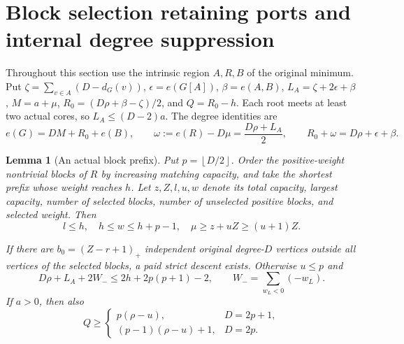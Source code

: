 \documentclass[11pt,a4paper]{article}
\newcommand{\floor}[1]{\left\lfloor#1\right\rfloor}
\newtheorem{lemma}[theorem]{Lemma}
\theoremstyle{definition}
\begin{document}
\section{Block selection retaining ports and internal degree suppression}\label{app:blocks}
Throughout this section use the intrinsic region $A,R,B$ of the original minimum.
Put $\zeta=\sum_{v\in A}(D-d_G(v))$, $\epsilon=e(G[A])$, $\beta=e(A,B)$,
$L_A=\zeta+2\epsilon+\beta$, $M=a+\mu$,
$R_0=(D\rho+\beta-\zeta)/2$, and $Q=R_0-h$.
Each root meets at least two actual cores, so $L_A\le(D-2)a$. The degree identities are
\begin{equation}\label{eq:block-account}
 e(G)=DM+R_0+e(B),\qquad
 \omega:=e(R)-D\mu=\frac{D\rho+L_A}{2},\qquad
 R_0+\omega=D\rho+\epsilon+\beta.
\end{equation}
\begin{lemma}[An actual block prefix]\label{lem:block-prefix}
Put $p=\floor{D/2}$. Order the positive-weight nontrivial blocks of $R$ by increasing matching capacity, and take the shortest prefix whose weight reaches $h$. Let $z,Z,l,u,w$ denote its total capacity, largest capacity, number of selected blocks, number of unselected positive blocks, and selected weight. Then
\[
 l\le h,\quad h\le w\le h+p-1,\quad
 \mu\ge z+uZ\ge(u+1)Z.
\]

If there are $b_0=(Z-r+1)_+$ independent original degree-$D$ vertices outside all vertices of the selected blocks, a paid strict descent exists. Otherwise $u\le p$ and
\begin{equation}\label{eq:block-failure}
 D\rho+L_A+2W_-\le2h+2p(p+1)-2,
 \qquad W_-=\sum_{w_L<0}(-w_L).
\end{equation}
If $a>0$, then also
\begin{equation}\label{eq:block-parity}
 Q\ge
 \begin{cases}
 p(\rho-u),&D=2p+1,\\
 (p-1)(\rho-u)+1,&D=2p.
 \end{cases}
\end{equation}
\end{lemma}
\end{document}
